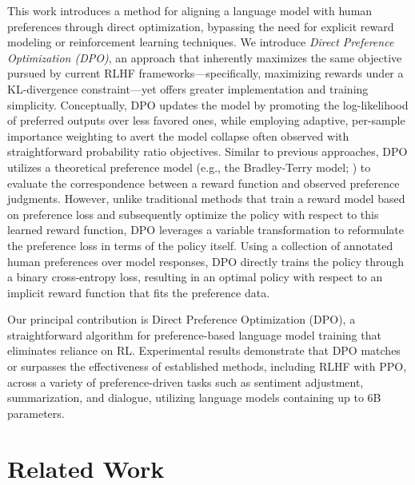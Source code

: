 This work introduces a method for aligning a language model with human preferences through direct optimization, bypassing the need for explicit reward modeling or reinforcement learning techniques. We introduce \textit{{Direct Preference Optimization} (DPO)}, an approach that inherently maximizes the same objective pursued by current RLHF frameworks—specifically, maximizing rewards under a KL-divergence constraint—yet offers greater implementation and training simplicity. Conceptually, DPO updates the model by promoting the log-likelihood of preferred outputs over less favored ones, while employing adaptive, per-sample importance weighting to avert the model collapse often observed with straightforward probability ratio objectives. Similar to previous approaches, DPO utilizes a theoretical preference model (e.g., the Bradley-Terry model; \cite{bradley1952rankanalysis}) to evaluate the correspondence between a reward function and observed preference judgments. However, unlike traditional methods that train a reward model based on preference loss and subsequently optimize the policy with respect to this learned reward function, DPO leverages a variable transformation to reformulate the preference loss in terms of the policy itself. Using a collection of annotated human preferences over model responses, DPO directly trains the policy through a binary cross-entropy loss, resulting in an optimal policy with respect to an implicit reward function that fits the preference data.

Our principal contribution is Direct Preference Optimization (DPO), a straightforward algorithm for preference-based language model training that eliminates reliance on RL. Experimental results demonstrate that DPO matches or surpasses the effectiveness of established methods, including RLHF with PPO, across a variety of preference-driven tasks such as sentiment adjustment, summarization, and dialogue, utilizing language models containing up to 6B parameters.

\section{Related Work}

